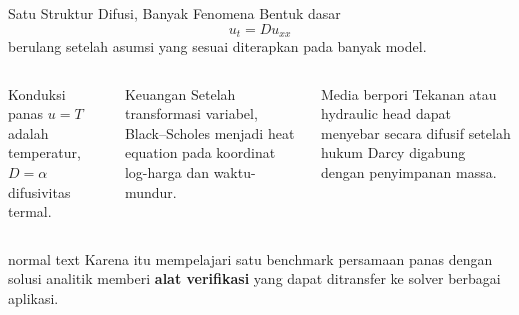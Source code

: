 \documentclass[aspectratio=169,10pt]{beamer}
\begin{document}
\begin{frame}{Satu Struktur Difusi, Banyak Fenomena}
\small
Bentuk dasar
\[
\boxed{u_t=D u_{xx}}
\]
berulang setelah asumsi yang sesuai diterapkan pada banyak model.
\begin{columns}[T,onlytextwidth]
\begin{block}{Konduksi panas}
$u=T$ adalah temperatur, $D=\alpha$ difusivitas termal.
\end{block}
\begin{block}{Keuangan}
Setelah transformasi variabel, Black--Scholes menjadi heat equation pada koordinat log-harga dan waktu-mundur.
\end{block}
\begin{block}{Media berpori}
Tekanan atau hydraulic head dapat menyebar secara difusif setelah hukum Darcy digabung dengan penyimpanan massa.
\end{block}
\end{columns}
\vspace{0.14cm}
\begin{beamercolorbox}[sep=.12cm,wd=\textwidth]{normal text}
\centering
Karena itu mempelajari satu benchmark persamaan panas dengan solusi analitik memberi \textbf{alat verifikasi} yang dapat ditransfer ke solver berbagai aplikasi.
\end{beamercolorbox}
\end{frame}
\end{document}
